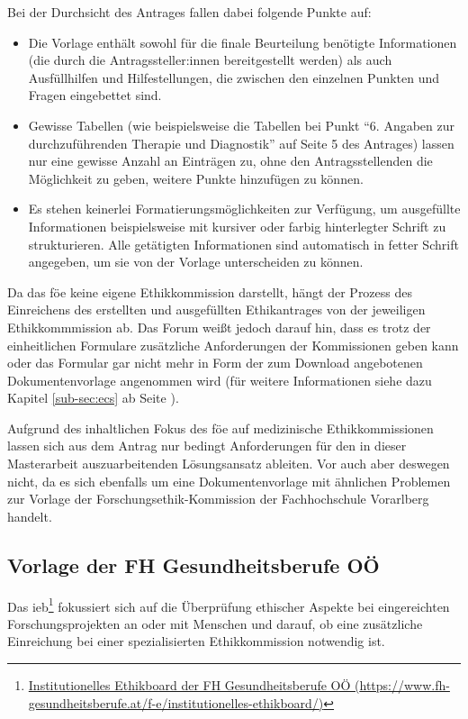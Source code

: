 Bei der Durchsicht des Antrages fallen dabei folgende Punkte auf:
\begin{itemize}
    \item Die Vorlage enthält sowohl für die finale Beurteilung benötigte Informationen (die durch die Antragssteller:innen bereitgestellt werden) als auch Ausfüllhilfen und Hilfestellungen, die zwischen den einzelnen Punkten und Fragen eingebettet sind.
    \item Gewisse Tabellen (wie beispielsweise die Tabellen bei Punkt \enquote{6. Angaben zur durchzuführenden Therapie und Diagnostik} auf Seite 5 des Antrages) lassen nur eine gewisse Anzahl an Einträgen zu, ohne den Antragsstellenden die Möglichkeit zu geben, weitere Punkte hinzufügen zu können.
    \item Es stehen keinerlei Formatierungsmöglichkeiten zur Verfügung, um ausgefüllte Informationen beispielsweise mit kursiver oder farbig hinterlegter Schrift zu strukturieren. Alle getätigten Informationen sind automatisch in fetter Schrift angegeben, um sie von der Vorlage unterscheiden zu können.
\end{itemize}

Da das \ac{föe} keine eigene Ethikkommission darstellt, hängt der Prozess des Einreichens des erstellten und ausgefüllten Ethikantrages von der jeweiligen Ethikkommmission ab. Das Forum weißt jedoch darauf hin, dass es trotz der einheitlichen Formulare zusätzliche Anforderungen der Kommissionen geben kann oder das Formular gar nicht mehr in Form der zum Download angebotenen Dokumentenvorlage angenommen wird (für weitere Informationen siehe dazu Kapitel \ref{sub-sec:ecs} ab Seite \pageref{sub-sec:ecs}).\cite{ethikkommission_der_medizinischen_universitat_graz_download_2012}

Aufgrund des inhaltlichen Fokus des \acl{föe} auf medizinische Ethikkommissionen lassen sich aus dem Antrag nur bedingt Anforderungen für den in dieser Masterarbeit auszuarbeitenden Lösungsansatz ableiten. Vor auch aber deswegen nicht, da es sich ebenfalls um eine Dokumentenvorlage mit ähnlichen Problemen zur Vorlage der Forschungsethik-Kommission der Fachhochschule Vorarlberg handelt.

\subsection{Vorlage der FH Gesundheitsberufe OÖ}
\label{sub-cec:vorlage-fh-oö}

Das \ac{ieb}\footnote{\href{https://www.fh-gesundheitsberufe.at/f-e/institutionelles-ethikboard/}{Institutionelles Ethikboard der FH Gesundheitsberufe OÖ (\url{https://www.fh-gesundheitsberufe.at/f-e/institutionelles-ethikboard/})}} fokussiert sich auf die Überprüfung ethischer Aspekte bei eingereichten Forschungsprojekten an oder mit Menschen und darauf, ob eine zusätzliche Einreichung bei einer spezialisierten Ethikkommission notwendig ist.\cite{fh_gesundheitsberufe_oo_gmbh_institutionelles_2023}

